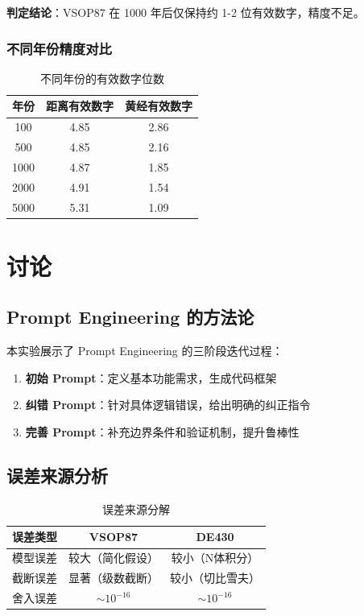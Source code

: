 \documentclass[12pt,a4paper]{article}
\begin{document}
\textbf{判定结论}：VSOP87 在 1000 年后仅保持约 1-2 位有效数字，精度不足。

\subsubsection{不同年份精度对比}

\begin{table}[H]
\centering
\caption{不同年份的有效数字位数}
\begin{tabular}{ccc}
\toprule
\textbf{年份} & \textbf{距离有效数字} & \textbf{黄经有效数字} \\
\midrule
100 & 4.85 & 2.86 \\
500 & 4.85 & 2.16 \\
1000 & 4.87 & 1.85 \\
2000 & 4.91 & 1.54 \\
5000 & 5.31 & 1.09 \\
\bottomrule
\end{tabular}
\end{table}

\section{讨论}

\subsection{Prompt Engineering 的方法论}

本实验展示了 Prompt Engineering 的三阶段迭代过程：

\begin{enumerate}
    \item \textbf{初始 Prompt}：定义基本功能需求，生成代码框架
    \item \textbf{纠错 Prompt}：针对具体逻辑错误，给出明确的纠正指令
    \item \textbf{完善 Prompt}：补充边界条件和验证机制，提升鲁棒性
\end{enumerate}

\subsection{误差来源分析}

\begin{table}[H]
\centering
\caption{误差来源分解}
\begin{tabular}{lcc}
\toprule
\textbf{误差类型} & \textbf{VSOP87} & \textbf{DE430} \\
\midrule
模型误差 & 较大（简化假设） & 较小（N体积分） \\
截断误差 & 显著（级数截断） & 较小（切比雪夫） \\
舍入误差 & $\sim 10^{-16}$ & $\sim 10^{-16}$ \\
\bottomrule
\end{tabular}
\end{table}
\end{document}
